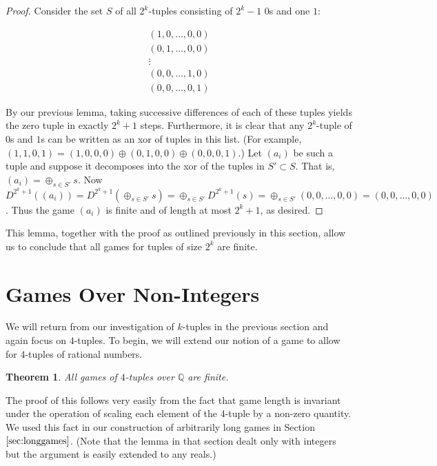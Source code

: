 \documentclass[12pt]{amsart}
\newtheorem{theorem}{Theorem}[section]
\newcommand{\xor}{\oplus}
\begin{document}
\begin{proof}
Consider the set $S$ of all $2^k$-tuples consisting of $2^k-1$ $0$s and one $1$:

$$\begin{array}{c}
(1,0,\ldots,0,0) \\
(0,1,\ldots,0,0) \\
\vdots \\
(0,0,\ldots,1,0) \\
(0,0,\ldots,0,1)
\end{array}$$

By our previous lemma, taking successive differences of each of these tuples yields the zero tuple in exactly $2^k+1$ steps. Furthermore, it is clear that any $2^k$-tuple of $0$s and $1$s can be written as an xor of tuples in this list. (For example, $(1,1,0,1)=(1,0,0,0)\xor(0,1,0,0)\xor(0,0,0,1)$.) Let $(a_i)$ be such a tuple and suppose it decomposes into the xor of the tuples in $S'\subset S$. That is, $(a_i)=\xor_{s\in S'} s$. Now $D^{2^k+1}((a_i))=D^{2^k+1}(\xor_{s\in S'} s)=\xor_{s\in S'} D^{2^k+1}(s)=\xor_{s\in S'} (0,0,\ldots,0,0) = (0,0,\ldots,0,0)$. Thus the game $(a_i)$ is finite and of length at most $2^k+1$, as desired.
\end{proof}

This lemma, together with the proof as outlined previously in this section, allow us to conclude that all games for tuples of size $2^k$ are finite.

\section{Games Over Non-Integers\label{sec:nonIntegers}}

We will return from our investigation of $k$-tuples in the previous section and again focus on $4$-tuples. To begin, we will extend our notion of a game to allow for $4$-tuples of rational numbers.

\begin{theorem}
All games of $4$-tuples over $\mathbb{Q}$ are finite.
\end{theorem}

The proof of this follows very easily from the fact that game length is invariant under the operation of scaling each element of the $4$-tuple by a non-zero quantity. We used this fact in our construction of arbitrarily long games in Section $\ref{sec:longgames}$. (Note that the lemma in that section dealt only with integers but the argument is easily extended to any reals.)
\end{document}
